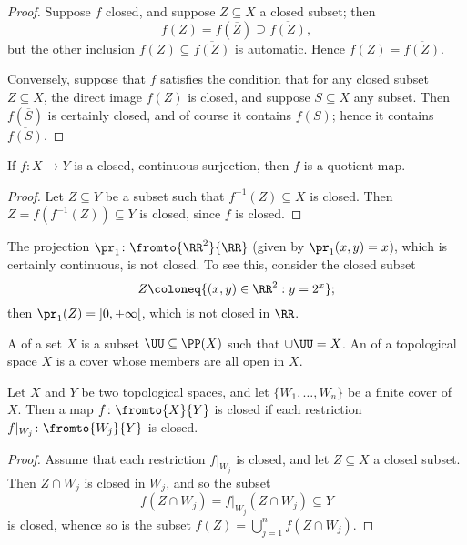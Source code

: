 \begin{proof}
	Suppose $f$ closed, and suppose $Z\subseteq X$ a closed subset;
	then
	\[
		f(Z)=f(\overline{Z})\supseteq\overline{f(Z)},
	\]
	but the other inclusion $f(Z)\subseteq\overline{f(Z)}$ is automatic.
	Hence $f(Z)=\overline{f(Z)}$.

	Conversely, suppose that $f$ satisfies the condition that for any closed subset $Z\subseteq X$, the direct image $f(Z)$ is closed, and suppose $S\subseteq X$ any subset.
	Then $f(\overline{S})$ is certainly closed, and of course it contains $f(S)$;
	hence it contains $\overline{f(S)}$.
\end{proof}

\begin{lem}
	If $ f\colon X \to Y $ is a closed, continuous surjection, then $f$ is a quotient map.
\end{lem}

\begin{proof}
	Let $Z \subseteq Y$ be a subset such that $f^{-1}(Z) \subseteq X$ is closed.
	Then $ Z = f(f^{-1}(Z)) \subseteq Y $ is closed, since $f$ is closed.
\end{proof}

\begin{exm}
	The projection $\pr_1\colon\fromto{\RR^2}{\RR}$ (given by $\pr_1(x,y)=x$), which is certainly continuous, is not closed.%
	To see this, consider the closed subset
	\[
		Z\coloneq\{(x,y)\in\RR^2 : y=2^x\};
	\]
	then $\pr_1(Z)=\left]0,+\infty\right[$, which is not closed in $\RR$.
\end{exm}

\begin{dfn}
	A  of a set $X$ is a subset $\UU\subseteq\PP(X)$ such that $\cup\UU=X$.
	An  of a topological space $X$ is a cover whose members are all open in $X$.
\end{dfn}

\begin{prp}
	Let $X$ and $Y$ be two topological spaces, and
	let $\{W_1,\dots,W_n\}$ be a finite cover of $X$.
	Then a map $f\colon\fromto{X}{Y}$ is closed if each restriction $f|_{W_j}\colon\fromto{W_j}{Y}$ is closed.
\end{prp}

\begin{proof}
	Assume that each restriction $f|_{W_j}$ is closed, and
	let $Z\subseteq X$ a closed subset.
	Then $Z\cap W_j$ is closed in $W_j$, and so the subset
	\[
		f(Z\cap W_j)=f|_{W_j}(Z\cap W_j)\subseteq Y
	\]
	is closed, whence so is the subset $f(Z)=\bigcup_{j=1}^nf(Z\cap W_j)$.
\end{proof}

